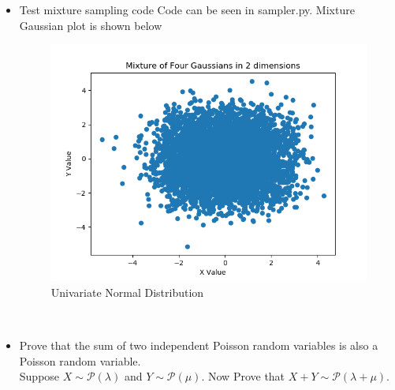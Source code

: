 \documentclass{article}
\begin{document}
\begin{itemize}
\item Test mixture sampling code
Code can be seen in sampler.py. Mixture Gaussian plot is shown below\\
\begin{figure}[htbp]
	\centering
	\includegraphics[scale = 0.5]{MixtureGaussians.png}
	\caption{Univariate Normal Distribution}
\end{figure}\\
\item Prove that the sum of two independent Poisson random variables is also a Poisson random variable.\\
Suppose $X \sim \mathcal{P}(\lambda)$ and $Y \sim \mathcal {P}(\mu)$. Now Prove that $X + Y \sim \mathcal{P}(\lambda + \mu)$.\\


\end{itemize}
\end{document}
